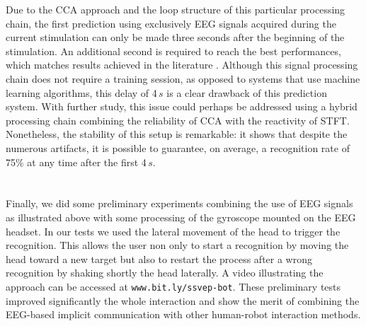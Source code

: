 \documentclass[smallextended]{svjour3}
\begin{document}
Due to the CCA approach and the loop structure of this particular processing chain, the first prediction using exclusively EEG signals acquired during the current stimulation can only be made three seconds after the beginning of the stimulation.
An additional second is required to reach the best performances, which matches results achieved in the literature \cite{car,SSVEPfiability,jian2014improving,paper4}. 
Although this signal processing chain does not require a training session, as opposed to systems that use machine learning algorithms, this delay of 4\,$s$ is a clear drawback of this prediction system. 
With further study, this issue could perhaps be addressed using a hybrid processing chain combining the reliability of CCA with the reactivity of STFT.
Nonetheless, the stability of this setup is remarkable: it shows that despite the numerous artifacts, it is possible to guarantee, on average, a recognition rate of 75\% at any time after the first 4\,$s$. \\
\\
\\
Finally, we did some preliminary experiments combining the use of EEG signals as illustrated above with some processing of the gyroscope mounted on the EEG headset. 
In our tests we used the lateral movement of the head to trigger the recognition. 
This allows the user non only to start a recognition by moving the head toward a new target but also to restart the process after a wrong recognition by shaking shortly the head laterally. 
A video illustrating the approach can be accessed at \verb"www.bit.ly/ssvep-bot". 
These preliminary tests improved significantly the whole interaction and show the merit of combining the EEG-based implicit communication with other human-robot interaction methods.
\end{document}
